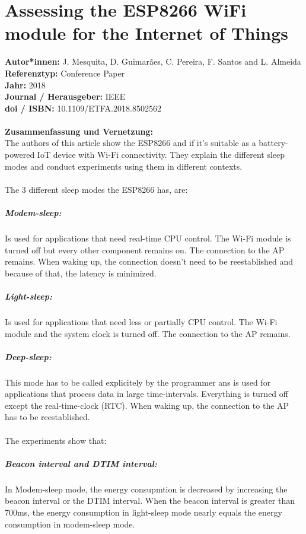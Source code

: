 \documentclass{report}
\begin{document}
{\let\clearpage\relax \chapter{Assessing the ESP8266 WiFi module for the Internet of Things}}
\noindent
\textbf{Autor*innen:} J. Mesquita, D. Guimarães, C. Pereira, F. Santos and L. Almeida\\
\textbf{Referenztyp:} Conference Paper\\
\textbf{Jahr:} 2018\\
\textbf{Journal / Herausgeber:} IEEE\\
\textbf{doi / ISBN:} 10.1109/ETFA.2018.8502562\\\\
\textbf{Zusammenfassung und Vernetzung:}\\
The authors of this article show the ESP8266 and if it's suitable as a battery-powered IoT device with Wi-Fi connectivity.
They explain the different sleep modes and conduct experiments using them in different contexts.\\\\
The 3 different sleep modes the ESP8266 has, are:\\
\paragraph{Modem-sleep:} Is used for applications that need real-time CPU control. The Wi-Fi module is turned off but every other component remains on. The connection to the AP remains. When waking up, the connection doesn't need to be reestablished and because of that, the latency is minimized.
\paragraph{Light-sleep:} Is used for applications that need less or partially CPU control. The Wi-Fi module and the system clock is turned off. The connection to the AP remains.
\paragraph{Deep-sleep:} This mode has to be called explicitely by the programmer ans is used for applications that process data in large time-intervals. Everything is turned off except the real-time-clock (RTC). When waking up, the connection to the AP has to be reestablished.\\\\
The experiments show that:
\paragraph{Beacon interval and DTIM interval:} 
In Modem-sleep mode, the energy consupmtion is decreased by increasing the beacon interval or the DTIM interval. When the beacon interval is greater than 700ms, the energy consumption in light-sleep mode nearly equals the energy consumption in modem-sleep mode.
\end{document}
